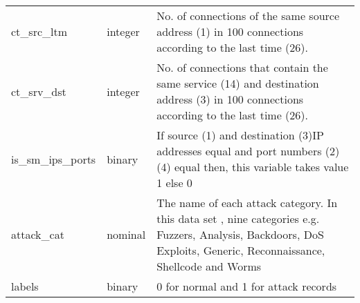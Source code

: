 \begin{longtable}{@{}p{}p{}p{}@{}}
ct\_src\_ltm & integer & No. of connections of the same source address (1) in 100 connections according to the last time (26). \\
ct\_srv\_dst & integer & No. of connections that contain the same service (14) and destination address (3) in 100 connections according to the last time (26). \\
is\_sm\_ips\_ports & binary & If source (1) and destination (3)IP addresses equal and port numbers (2)(4)  equal then, this variable takes value 1 else 0 \\
attack\_cat & nominal & The name of each attack category. In this data set , nine categories e.g. Fuzzers, Analysis, Backdoors, DoS Exploits, Generic, Reconnaissance, Shellcode and Worms \\
labels & binary & 0 for normal and 1 for attack records \\ \bottomrule
\end{longtable}
